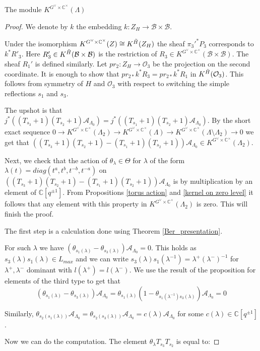 \documentclass[12pt]{article}
\newcommand{\A}{\mathcal{A}}
\newcommand{\B}{\mathcal{B}}
\newcommand{\C}{\mathbb{C}}
\newcommand{\s}{\mathcal{O}}
\newcommand{\<}{\langle}
\renewcommand{\>}{\rangle}
\theoremstyle{plain}
\theoremstyle{definition}
\begin{document}
\begin{section}{The module $K^{G^\vee\times \C^\times}(\Lambda)$}
\begin{proof}
We denote by $k$ the embedding $k:Z_H\rightarrow \B\times \B$. 

Under the isomorphism $K^{G^\vee\times\C^\times}(Z)\cong K^{\Tilde{H}}(Z_H)$ the sheaf $\pi_3'^*P_3$ corresponds to $k^*R'_3$. Here $R'_3\in K^{\Tilde{H}}(\B\times \B)$ is the restriction of $R_3\in K^{G^\vee\times\C^\times}(\B\times \B)$. The sheaf $R_1'$ is defined similarly. Let $pr_2:Z_H\rightarrow \s_3$ be the projection on the second coordinate. It is enough to show that $pr_{2*}k^*R_3=pr_{2*}k^*R_1$ in $K^{\Tilde{H}}(\s_3)$. This follows from symmetry of $H$ and $\s_3$ with respect to switching the simple reflections $s_1$ and $s_3$.

The upshot is that $j^*((T_{s_{3}}+1)(T_{s_{2}}+1)\A_{\Lambda_0})=j^*((T_{s_{1}}+1)(T_{s_{2}}+1)\A_{\Lambda_0})$. By the short exact sequence $0\rightarrow K^{G^\vee\times\C^\times}(\Lambda_2)\rightarrow K^{G^\vee\times\C^\times}(\Lambda)\rightarrow K^{G^\vee\times\C^\times}(\Lambda\setminus \Lambda_2)\rightarrow 0$ we get that $((T_{s_{3}}+1)(T_{s_{2}}+1)-(T_{s_{1}}+1)(T_{s_{2}}+1))\A_{\Lambda_0}\in K^{G^\vee\times\C^\times}(\Lambda_2)$. 

Next, we check that the action of $\theta_\lambda\in \Theta$ for $\lambda$ of the form $\lambda(t)=diag(t^a,t^b,t^{-b},t^{-a})$ on $((T_{s_{3}}+1)(T_{s_{2}}+1)-(T_{s_{1}}+1)(T_{s_{2}}+1))\A_{\Lambda_0}$ is by multiplication by an element of $\C[q^{\pm 1}]$. From Propositions \ref{torus action} and \ref{kernel on zero level} it follows that any element with this property in  $K^{G^\vee\times\C^\times}(\Lambda_2)$ is zero. This will finish the proof.

The first step is a calculation done using Theorem \ref{Ber_presentation}.

For such $\lambda$ we have $(\theta_{s_1(\lambda)}-\theta_{s_3(\lambda)})\A_{\Lambda_0}=0$. This holds as $s_3(\lambda)s_1(\lambda)\in L_{max}$ and we can write $s_3(\lambda)s_1(\lambda^{-1})=\lambda^+(\lambda^-)^{-1}$ for $\lambda^+,\lambda^-$ dominant with $l(\lambda^+)=l(\lambda^-)$. We use the result of the proposition for elements of the third type to get that $$(\theta_{s_1(\lambda)}-\theta_{s_3(\lambda)})\A_{\Lambda_0}=\theta_{s_1(\lambda)}(1-\theta_{s_1(\lambda^{-1})s_3(\lambda)})\A_{\Lambda_0}=0$$

Similarly, $\theta_{s_2(s_1(\lambda))}\A_{\Lambda_0}=\theta_{s_2(s_3(\lambda))}\A_{\Lambda_0}=c(\lambda)\A_{\Lambda_0}$ for some $c(\lambda)\in \C[q^{\pm1}]$. 

Now we can do the computation. The element $\theta_\lambda T_{s_3}T_{s_{2}}$ is equal to:


\end{proof}
\end{section}
\end{document}
